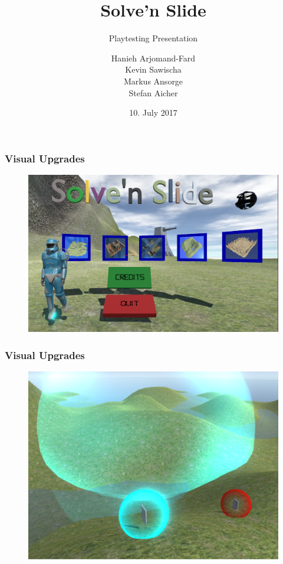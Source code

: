 \documentclass[xcolor=dvipsnames]{beamer}
\title{Solve'n Slide}
\subtitle{Playtesting Presentation}
\author{Hanieh Arjomand-Fard\\Kevin Sawischa\\Markus Ansorge\\Stefan Aicher}
\date{10. July 2017}
\begin{document}
	\maketitle
	
	\begin{frame}
		\frametitle{Visual Upgrades}
		\begin{figure}[H]
			\centering
			\includegraphics[width=\textwidth]{images/playtesting/MainMenu2}
		\end{figure}
	\end{frame}
	
	\begin{frame}
		\frametitle{Visual Upgrades}
		\begin{figure}[H]
			\centering
			\includegraphics[scale=0.7]{images/playtesting/KeysForceField}
		\end{figure}
	\end{frame}
	
\end{document}
